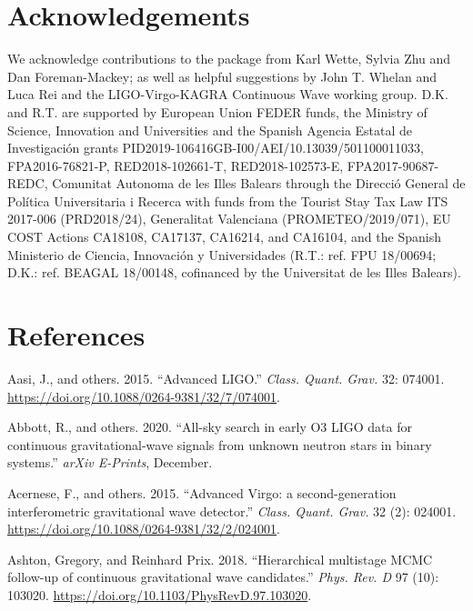 \documentclass[10pt,a4paper,onecolumn]{article}
\let\textttOrig=\texttt
\def\texttt#1{\expandafter\textttOrig{\seqsplit{#1}}}
\let\addcontentslineOrig=\addcontentsline
\def\addcontentsline#1#2#3{\bgroup
  \let\texttt=\textttOrig\addcontentslineOrig{#1}{#2}{#3}\egroup}
\begin{document}
\hypertarget{acknowledgements}{%
\section{Acknowledgements}\label{acknowledgements}}

We acknowledge contributions to the package from Karl Wette, Sylvia Zhu
and Dan Foreman-Mackey; as well as helpful suggestions by John T. Whelan
and Luca Rei and the LIGO-Virgo-KAGRA Continuous Wave working group.
D.K. and R.T. are supported by European Union FEDER funds, the Ministry
of Science, Innovation and Universities and the Spanish Agencia Estatal
de Investigación grants PID2019-106416GB-I00/AEI/10.13039/501100011033,
FPA2016-76821-P, RED2018-102661-T, RED2018-102573-E, FPA2017-90687-REDC,
Comunitat Autonoma de les Illes Balears through the Direcció General de
Política Universitaria i Recerca with funds from the Tourist Stay Tax
Law ITS 2017-006 (PRD2018/24), Generalitat Valenciana
(PROMETEO/2019/071), EU COST Actions CA18108, CA17137, CA16214, and
CA16104, and the Spanish Ministerio de Ciencia, Innovación y
Universidades (R.T.: ref. FPU 18/00694; D.K.: ref. BEAGAL 18/00148,
cofinanced by the Universitat de les Illes Balears).

\hypertarget{references}{%
\section*{References}\label{references}}

\hypertarget{refs}{}
\leavevmode\hypertarget{ref-TheLIGOScientific:2014jea}{}%
Aasi, J., and others. 2015. ``Advanced LIGO.'' \emph{Class. Quant.
Grav.} 32: 074001. \url{https://doi.org/10.1088/0264-9381/32/7/074001}.

\leavevmode\hypertarget{ref-Abbott:2020mev}{}%
Abbott, R., and others. 2020. ``All-sky search in early O3 LIGO data for
continuous gravitational-wave signals from unknown neutron stars in
binary systems.'' \emph{arXiv E-Prints}, December.

\leavevmode\hypertarget{ref-TheVirgo:2014hva}{}%
Acernese, F., and others. 2015. ``Advanced Virgo: a second-generation
interferometric gravitational wave detector.'' \emph{Class. Quant.
Grav.} 32 (2): 024001.
\url{https://doi.org/10.1088/0264-9381/32/2/024001}.

\leavevmode\hypertarget{ref-Ashton:2018ure}{}%
Ashton, Gregory, and Reinhard Prix. 2018. ``Hierarchical multistage MCMC
follow-up of continuous gravitational wave candidates.'' \emph{Phys.
Rev. D} 97 (10): 103020.
\url{https://doi.org/10.1103/PhysRevD.97.103020}.
\end{document}
